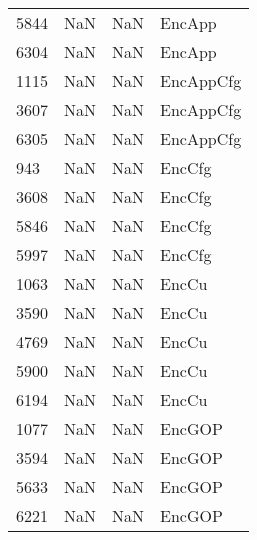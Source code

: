 \begin{tabular}{llll}
5844 &                   NaN &                        NaN &                                    EncApp \\
6304 &                   NaN &                        NaN &                                    EncApp \\
1115 &                   NaN &                        NaN &                                 EncAppCfg \\
3607 &                   NaN &                        NaN &                                 EncAppCfg \\
6305 &                   NaN &                        NaN &                                 EncAppCfg \\
943  &                   NaN &                        NaN &                                    EncCfg \\
3608 &                   NaN &                        NaN &                                    EncCfg \\
5846 &                   NaN &                        NaN &                                    EncCfg \\
5997 &                   NaN &                        NaN &                                    EncCfg \\
1063 &                   NaN &                        NaN &                                     EncCu \\
3590 &                   NaN &                        NaN &                                     EncCu \\
4769 &                   NaN &                        NaN &                                     EncCu \\
5900 &                   NaN &                        NaN &                                     EncCu \\
6194 &                   NaN &                        NaN &                                     EncCu \\
1077 &                   NaN &                        NaN &                                    EncGOP \\
3594 &                   NaN &                        NaN &                                    EncGOP \\
5633 &                   NaN &                        NaN &                                    EncGOP \\
6221 &                   NaN &                        NaN &                                    EncGOP \\

\end{tabular}
